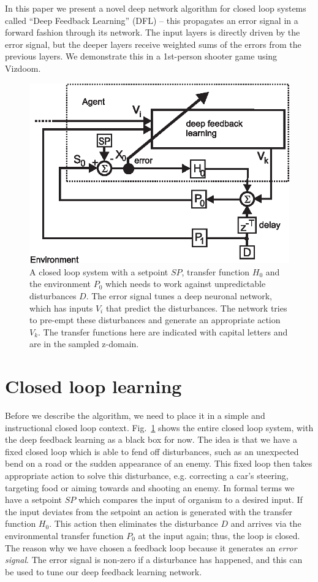 \documentclass{article}
\begin{document}
In this paper we present a novel deep network algorithm for closed
loop systems called ``Deep Feedback Learning'' (DFL) -- this
propagates an error signal in a forward fashion through its
network. The input layers is directly driven by the error signal, but the
deeper layers receive weighted sums of the errors from the previous
layers.  We demonstrate this in a 1st-person shooter game using
Vizdoom.

\begin{figure}[!ht]
  \centering
  \includegraphics[width=0.75\columnwidth]{closed_loop}
  \caption{A closed loop system with a setpoint $SP$, transfer
    function $H_0$ and the environment $P_0$ which needs to work
    against unpredictable disturbances $D$.  The error signal tunes a
    deep neuronal network, which has inputs $V_i$ that predict the
    disturbances. The network tries to pre-empt these disturbances and
    generate an appropriate action $V_k$. The transfer functions here
    are indicated with capital letters and are in the sampled
    z-domain.
    \label{closed_loop}}
\end{figure}

\section{Closed loop learning}
Before we describe the algorithm, we need to place it in a simple and
instructional closed loop context. Fig.~\ref{closed_loop} shows the
entire closed loop system, with the deep feedback learning as a black
box for now. The idea is that we have a fixed closed loop which is
able to fend off disturbances, such as an unexpected bend on a road or
the sudden appearance of an enemy. This fixed loop then takes
appropriate action to solve this disturbance, e.g. correcting a car's
steering, targeting food or aiming towards and shooting an enemy. In
formal terms we have a setpoint $SP$ which compares the input of
organism to a desired input. If the input deviates from the setpoint
an action is generated with the transfer function $H_0$. This action
then eliminates the disturbance $D$ and arrives via the environmental
transfer function $P_0$ at the input again; thus, the loop is
closed. The reason why we have chosen a feedback loop because it
generates an \textsl{error signal}. The error signal is
non-zero if a disturbance has happened, and this can be used to tune
our deep feedback learning network.
\end{document}
